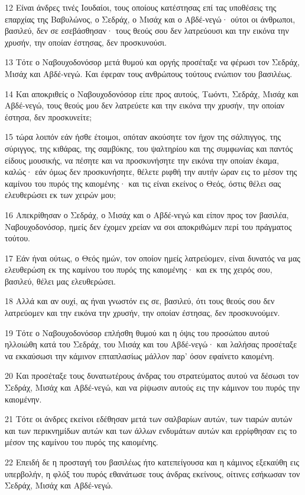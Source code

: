 \par 12 Είναι άνδρες τινές Ιουδαίοι, τους οποίους κατέστησας επί τας υποθέσεις της επαρχίας της Βαβυλώνος, ο Σεδράχ, ο Μισάχ και ο Αβδέ-νεγώ· ούτοι οι άνθρωποι, βασιλεύ, δεν σε εσεβάσθησαν· τους θεούς σου δεν λατρεύουσι και την εικόνα την χρυσήν, την οποίαν έστησας, δεν προσκυνούσι.
\par 13 Τότε ο Ναβουχοδονόσορ μετά θυμού και οργής προσέταξε να φέρωσι τον Σεδράχ, Μισάχ και Αβδέ-νεγώ. Και έφεραν τους ανθρώπους τούτους ενώπιον του βασιλέως.
\par 14 Και αποκριθείς ο Ναβουχοδονόσορ είπε προς αυτούς, Τωόντι, Σεδράχ, Μισάχ και Αβδέ-νεγώ, τους θεούς μου δεν λατρεύετε και την εικόνα την χρυσήν, την οποίαν έστησα, δεν προσκυνείτε;
\par 15 τώρα λοιπόν εάν ήσθε έτοιμοι, οπόταν ακούσητε τον ήχον της σάλπιγγος, της σύριγγος, της κιθάρας, της σαμβύκης, του ψαλτηρίου και της συμφωνίας και παντός είδους μουσικής, να πέσητε και να προσκυνήσητε την εικόνα την οποίαν έκαμα, καλώς· εάν όμως δεν προσκυνήσητε, θέλετε ριφθή την αυτήν ώραν εις το μέσον της καμίνου του πυρός της καιομένης· και τις είναι εκείνος ο Θεός, όστις θέλει σας ελευθερώσει εκ των χειρών μου;
\par 16 Απεκρίθησαν ο Σεδράχ, ο Μισάχ και ο Αβδέ-νεγώ και είπον προς τον βασιλέα, Ναβουχοδονόσορ, ημείς δεν έχομεν χρείαν να σοι αποκριθώμεν περί του πράγματος τούτου.
\par 17 Εάν ήναι ούτως, ο Θεός ημών, τον οποίον ημείς λατρεύομεν, είναι δυνατός να μας ελευθερώση εκ της καμίνου του πυρός της καιομένης· και εκ της χειρός σου, βασιλεύ, θέλει μας ελευθερώσει.
\par 18 Αλλά και αν ουχί, ας ήναι γνωστόν εις σε, βασιλεύ, ότι τους θεούς σου δεν λατρεύομεν και την εικόνα την χρυσήν, την οποίαν έστησας, δεν προσκυνούμεν.
\par 19 Τότε ο Ναβουχοδονόσορ επλήσθη θυμού και η όψις του προσώπου αυτού ηλλοιώθη κατά του Σεδράχ, του Μισάχ και του Αβδέ-νεγώ· και λαλήσας προσέταξε να εκκαύσωσι την κάμινον επταπλασίως μάλλον παρ' όσον εφαίνετο καιομένη.
\par 20 Και προσέταξε τους δυνατωτέρους άνδρας του στρατεύματος αυτού να δέσωσι τον Σεδράχ, Μισάχ και Αβδέ-νεγώ, και να ρίψωσιν αυτούς εις την κάμινον του πυρός την καιομένην.
\par 21 Τότε οι άνδρες εκείνοι εδέθησαν μετά των σαλβαρίων αυτών, των τιαρών αυτών και των περικνημίδων αυτών και των άλλων ενδυμάτων αυτών και ερρίφθησαν εις το μέσον της καμίνου του πυρός της καιομένης.
\par 22 Επειδή δε η προσταγή του βασιλέως ήτο κατεπείγουσα και η κάμινος εξεκαύθη εις υπερβολήν, η φλόξ του πυρός εθανάτωσε τους άνδρας εκείνους, οίτινες εσήκωσαν τον Σεδράχ, Μισάχ και Αβδέ-νεγώ.

